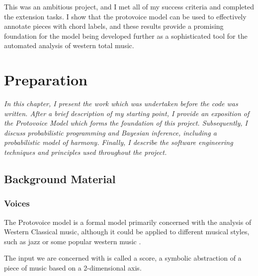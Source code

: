 \documentclass[12pt,a4paper,twoside,openright]{report}
\theoremstyle{definition}
\begin{document}
This was an ambitious project, and I met all of my success criteria and completed the extension tasks. I show that the protovoice model can be used to effectively annotate pieces with chord labels, and these results provide a promising foundation for the model being developed further as a sophisticated tool for the automated analysis of western total music.



\chapter{Preparation}
\textit{In this chapter, I present the work which was undertaken before the code was written. After a brief description of my starting point, I provide an exposition of the Protovoice Model which forms the foundation of this project. Subsequently, I discuss probabilistic programming and Bayesian inference, including a probabilistic model of harmony. Finally, I describe the software engineering techniques and principles used throughout the project. }

\section{Background Material}

\subsection{Voices}

The Protovoice model is a formal model primarily concerned with the analysis of Western Classical music, although it could be applied to different musical styles, such as jazz or some popular western music \cite{finkensiepStructureFreePolyphony2023}. 
\par
The input we are concerned with is called a score, a symbolic abstraction of a piece of music based on a 2-dimensional axis.
\end{document}
